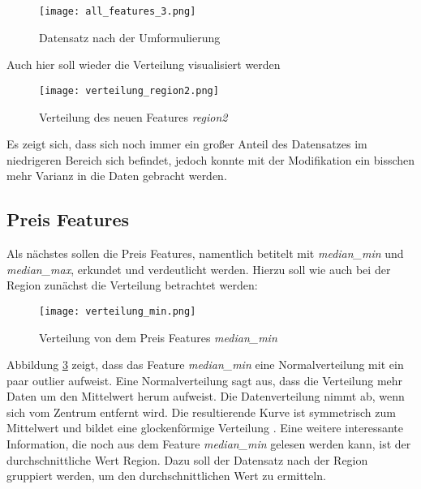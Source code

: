 \begin{figure}[h]
    \centering
    \texttt{[image: all\_features\_3.png]}
    \caption[Datensatz nach der Umformulierung]{Datensatz nach der Umformulierung}
    \label{img:all_features_3}
\end{figure}

Auch hier soll wieder die Verteilung visualisiert werden

\begin{figure}[h]
    \centering
    \texttt{[image: verteilung\_region2.png]}
    \caption[Verteilung des neuen Features \emph{region2}]{Verteilung des neuen Features \emph{region2}}
    \label{img:verteilung_region_2}
\end{figure}

Es zeigt sich, dass sich noch immer ein großer Anteil des Datensatzes im niedrigeren Bereich sich befindet, jedoch konnte mit der Modifikation ein bisschen mehr Varianz in die Daten gebracht werden.

\subsection{Preis Features}
Als nächstes sollen die Preis Features, namentlich betitelt mit \emph{median\_min} und \emph{median\_max}, erkundet und verdeutlicht werden. Hierzu soll wie auch bei der Region zunächst die Verteilung betrachtet werden:
\newpage
\begin{figure}[h]
    \centering
    \texttt{[image: verteilung\_min.png]}
    \caption[Verteilung von dem Preis Features \emph{median\_min}]{Verteilung von dem Preis Features \emph{median\_min}}
    \label{img:verteilung_min}
\end{figure}

Abbildung \ref{img:verteilung_min} zeigt, dass das Feature \emph{median\_min} eine Normalverteilung mit ein paar outlier aufweist. Eine Normalverteilung  sagt aus, dass die Verteilung mehr Daten um den Mittelwert herum aufweist. Die Datenverteilung nimmt ab, wenn sich vom Zentrum entfernt wird. Die resultierende Kurve ist symmetrisch zum Mittelwert und bildet eine glockenförmige Verteilung \cite{Shrishty.05.08.2021}.
\newline
\newline
Eine weitere interessante Information, die noch aus dem Feature \emph{median\_min} gelesen werden kann, ist der durchschnittliche Wert Region. Dazu soll der Datensatz nach der Region gruppiert werden, um den durchschnittlichen Wert zu ermitteln.

